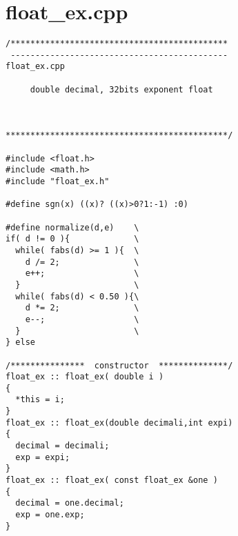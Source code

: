 \section{float\_ex.cpp}
\begin{verbatim}
/********************************************
 --------------------------------------------
float_ex.cpp

     double decimal, 32bits exponent float



*********************************************/

#include <float.h>
#include <math.h>
#include "float_ex.h"

#define sgn(x) ((x)? ((x)>0?1:-1) :0)

#define normalize(d,e)    \
if( d != 0 ){             \
  while( fabs(d) >= 1 ){  \
    d /= 2;               \
    e++;                  \
  }                       \
  while( fabs(d) < 0.50 ){\
    d *= 2;               \
    e--;                  \
  }                       \
} else

/***************  constructor  **************/
float_ex :: float_ex( double i )
{
  *this = i;
}
float_ex :: float_ex(double decimali,int expi)
{
  decimal = decimali;
  exp = expi;
}
float_ex :: float_ex( const float_ex &one )
{
  decimal = one.decimal;
  exp = one.exp;
}


\end{verbatim}
